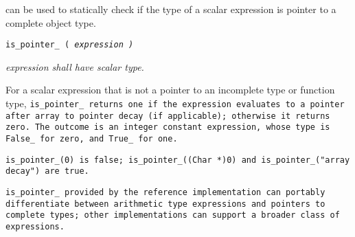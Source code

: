  can be used to statically check if the type
of a scalar expression is pointer to a complete object type.


\tt{is_pointer_ (} \it{expression} \tt{)}


\it{expression} shall have scalar type.


For a scalar expression that is not a pointer to an incomplete type or function
type, \tt{is_pointer_} returns one if the expression evaluates to a pointer
after array to pointer decay (if applicable); otherwise it returns zero.
The outcome is an integer constant expression,
whose type is \tt{False_} for zero, and \tt{True_} for one.

\example \tt{is_pointer_(0)} is false; \tt{is_pointer_((Char *)0)}
and \tt{is_pointer_("array decay")} are true.

\note \tt{is_pointer_} provided by the reference implementation can portably
differentiate between arithmetic type expressions and pointers to complete types;
other implementations can support a broader class of expressions.
